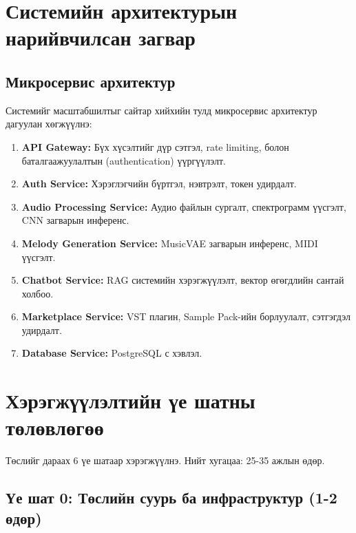 \section{Системийн архитектурын нарийвчилсан загвар}

\subsection{Микросервис архитектур}

Системийг масштабшилтыг сайтар хийхийн тулд микросервис архитектур дагуулан хөгжүүлнэ:

\begin{enumerate}
    \item \textbf{API Gateway:} Бүх хүсэлтийг дүр сэтгэл, rate limiting, болон баталгаажуулалтын (authentication) үүргүүлэлт.
    
    \item \textbf{Auth Service:} Хэрэглэгчийн бүртгэл, нэвтрэлт, токен удирдалт.
    
    \item \textbf{Audio Processing Service:} Аудио файлын сургалт, спектрограмм үүсгэлт, CNN загварын инференс.
    
    \item \textbf{Melody Generation Service:} MusicVAE загварын инференс, MIDI үүсгэлт.
    
    \item \textbf{Chatbot Service:} RAG системийн хэрэгжүүлэлт, вектор өгөгдлийн сантай холбоо.
    
    \item \textbf{Marketplace Service:} VST плагин, Sample Pack-ийн борлуулалт, сэтгэгдэл удирдалт.
    
    \item \textbf{Database Service:} PostgreSQL с хэвлэл.
\end{enumerate}

\section{Хэрэгжүүлэлтийн үе шатны төлөвлөгөө}

Төслийг дараах 6 үе шатаар хэрэгжүүлнэ. Нийт хугацаа: 25-35 ажлын өдөр.

\subsection{Үе шат 0: Төслийн суурь ба инфраструктур (1-2 өдөр)}

